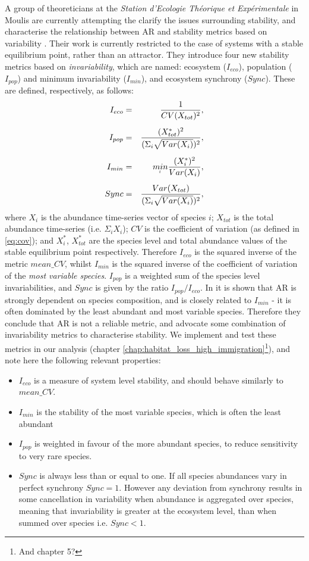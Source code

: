 A group of theoreticians at the \emph{Station d'Ecologie Th\'eorique et Exp\'erimentale} in Moulis are currently attempting the clarify the issues surrounding stability, and characterise the relationship between AR and stability metrics based on variability \cite{arnoldi2015,montoya2016invariability}. Their work is currently restricted to the case of systems with a stable equilibrium point, rather than an attractor. They introduce four new stability metrics based on \emph{invariability}, which are named: ecosystem ($I_{eco}$), population ($I_{pop}$) and minimum invariability ($I_{min}$), and ecosystem synchrony ($Sync$). These are defined, respectively, as follows:
\begin{eqnarray}
I_{eco} &=& \frac{1}{CV(X_{tot})^2}, \\[5pt] 
I_{pop} &=& \frac{(X_{tot}^*)^2}{(\Sigma_i \sqrt{Var(X_i)})^2}, \\[5pt]
I_{min} &=& \underaccent{i}{min} \frac{(X_i^*)^2}{Var(X_i)}, \\[5pt]
Sync    &=& \frac{Var(X_{tot})}{(\Sigma_i \sqrt{Var(X_i)})^2},
\end{eqnarray}
where $X_i$ is the abundance time-series vector of species $i$; $X_{tot}$ is the total abundance time-series (i.e.  $\Sigma_i X_i$);  $CV$ is the coefficient of variation (as defined in \eqref{eq:cov}); and $X_i^*$, $X_{tot}^*$ are the species level and total abundance values of the stable equilibrium point respectively. Therefore $I_{eco}$ is the squared inverse of the metric $mean\_CV$, whilst $I_{min}$ is the squared inverse of the coefficient of variation of the \emph{most variable species}. $I_{pop}$ is a weighted sum of the species level invariabilities, and $Sync$ is given by the ratio $I_{pop} / I_{eco}$. In \cite{montoya2016invariability} it is shown that AR is strongly dependent on species composition, and is closely related to $I_{min}$ - it is often dominated by the least abundant and most variable species. Therefore they conclude that AR is not a reliable metric, and advocate some combination of invariability metrics to characterise stability. We implement and test these metrics in our analysis (chapter \ref{chap:habitat_loss_high_immigration}\footnote{And chapter 5?}), and note here the following relevant properties:

\begin{itemize}
	\item $I_{eco}$ is a measure of system level stability, and should behave similarly to $mean\_CV$.
	\item $I_{min}$ is the stability of the most variable species, which is often the least abundant \cite{montoya2016invariability}
	\item $I_{pop}$ is weighted in favour of the more abundant species, to reduce sensitivity to very rare species.
	\item $Sync$ is always less than or equal to one. If all species abundances vary in perfect synchrony $Sync=1$. However any deviation from synchrony results in some cancellation in variability when abundance is aggregated over species, meaning that invariability is greater at the ecosystem level, than when summed over species i.e. $Sync<1$.
\end{itemize}


